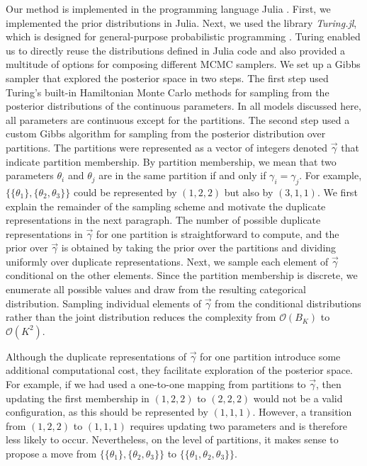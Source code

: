 \documentclass[11pt,a4paper]{article}
\theoremstyle{definition} %
\theoremstyle{case}
\begin{document}
Our method is implemented in the programming language Julia \parencite{Julia2017Bezanson}. First, we implemented the prior distributions in Julia. Next, we used the library \emph{Turing.jl}, which is designed for general-purpose probabilistic programming \parencite{Turing2018Ge}. Turing enabled us to directly reuse the distributions defined in Julia code and also provided a multitude of options for composing different MCMC samplers. We set up a Gibbs sampler that explored the posterior space in two steps. The first step used Turing's built-in Hamiltonian Monte Carlo methods for sampling from the posterior distributions of the continuous parameters. In all models discussed here, all parameters are continuous except for the partitions. The second step used a custom Gibbs algorithm for sampling from the posterior distribution over partitions. The partitions were represented as a vector of integers denoted $\vec{\gamma}$ that indicate partition membership. By partition membership, we mean that two parameters $\theta_i$ and $\theta_j$ are in the same partition if and only if $\gamma_i = \gamma_j$. For example, $\{\{\theta_1\}, \{\theta_2, \theta_3\}\}$ could be represented by $(1, 2, 2)$ but also by $(3, 1, 1)$. We first explain the remainder of the sampling scheme and motivate the duplicate representations in the next paragraph. The number of possible duplicate representations in $\vec{\gamma}$ for one partition is straightforward to compute, and the prior over $\vec{\gamma}$ is obtained by taking the prior over the partitions and dividing uniformly over duplicate representations. Next, we sample each element of $\vec{\gamma}$ conditional on the other elements. Since the partition membership is discrete, we enumerate all possible values and draw from the resulting categorical distribution. Sampling individual elements of $\vec{\gamma}$ from the conditional distributions rather than the joint distribution reduces the complexity from $\mathcal{O}(B_K)$ to $\mathcal{O}(K^2)$.

Although the duplicate representations of $\vec{\gamma}$ for one partition introduce some additional computational cost, they facilitate exploration of the posterior space. For example, if we had used a one-to-one mapping from partitions to $\vec{\gamma}$, then updating the first membership in $(1, 2, 2)$ to $(2, 2, 2)$ would not be a valid configuration, as this should be represented by $(1, 1, 1)$. However, a transition from $(1, 2, 2)$ to $(1, 1, 1)$ requires updating two parameters and is therefore less likely to occur. Nevertheless, on the level of partitions, it makes sense to propose a move from $\{\{\theta_1\}, \{\theta_2, \theta_3\}\}$ to $\{\{\theta_1, \theta_2, \theta_3\}\}$.
\end{document}
